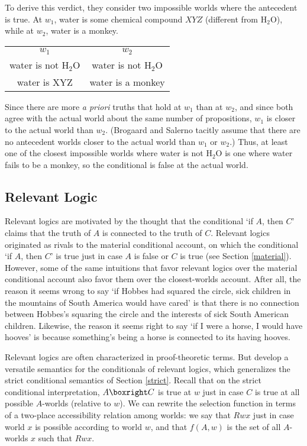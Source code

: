 To derive this verdict, they consider two impossible worlds where the antecedent is true.  At $w_1$, water is some chemical compound $XYZ$ (different from H$_2$O), while at $w_2$, water is a monkey.
\begin{center}
\begin{tabular}{cc}
$w_1$ & $w_2$\\
water is not H$_2$O & water is not H$_2$O\\
water is XYZ & water is a monkey
\end{tabular}
\end{center}
Since there are more \emph{a priori} truths that hold at $w_1$ than at $w_2$, and since both agree with the actual world about the same number of propositions, $w_1$ is closer to the actual world than $w_2$.  (Brogaard and Salerno tacitly assume that there are no antecedent worlds closer to the actual world than $w_1$ or $w_2$.)  Thus, at least one of the closest impossible worlds where water is not H$_2$O is one where water fails to be a monkey, so the conditional is false at the actual world.

\subsection{Relevant Logic}

Relevant logics are motivated by the thought that the conditional `if $A$, then $C$' claims that the truth of $A$ is connected to the truth of $C$.  Relevant logics originated as rivals to the material conditional account, on which the conditional `if $A$, then $C$' is true just in case $A$ is false or $C$ is true (see Section \ref{material}).  However, some of the same intuitions that favor relevant logics over the material conditional account also favor them over the closest-worlds account.  After all, the reason it seems wrong to say `if Hobbes had squared the circle, sick children in the mountains of South America would have cared' is that there is no connection between Hobbes's squaring the circle and the interests of sick South American children.  Likewise, the reason it seems right to say `if I were a horse, I would have hooves' is because something's being a horse is connected to its having hooves.

Relevant logics are often characterized in proof-theoretic terms.  But \citet{routley-meyer-1, routley-meyer-2, routley-meyer-3} develop a versatile semantics for the conditionals of relevant logics, which generalizes the strict conditional semantics of Section \ref{strict}.  Recall that on the strict conditional interpretation, $A \boxright C$ is true at $w$ just in case $C$ is true at all possible $A$-worlds (relative to $w$).  We can rewrite the selection function in terms of a two-place accessibility relation among worlds: we say that $Rwx$ just in case world $x$ is possible according to world $w$, and that $f(A, w)$ is the set of all $A$-worlds $x$ such that $Rwx$.

